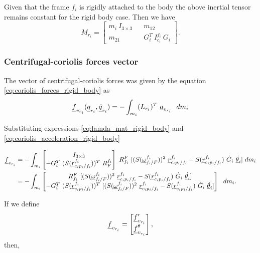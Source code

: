 Given that the frame $f_i$ is rigidly attached to the body the above inertial 
tensor remains constant for the rigid body case. Then we have 
\begin{equation}
    M_{r_i} = \begin{bmatrix}
        m_{i}\ I_{3 \times 3} && m_{12} \\ m_{21} && G^{T}_{i} \ I^{f_i}_{c_i}\ G_i
    \end{bmatrix}.
    \label{eq:mass_matrix_rigid_body}
\end{equation}



\subsubsection{Centrifugal-coriolis forces vector}
The vector of centrifugal-coriolis forces was given by the equation 
\eqref{eq:coriolis_forces_rigid_body} as
\[
    \vecd{f}_{v_{r_i}}(\vecd{q}_{r_{i}}, 
    \vecd{\dot{q}}_{r_{i}}) = - \int_{m_i} (L_{r_i})^{T} \ \vecd{a}_{v_{r_i}}\ 
    \ dm_{i}
\]

Substituting expressions \eqref{eq:lamda_mat_rigid_body} and 
\eqref{eq:coriolis_acceleration_rigid_body}

\begin{align}
    \vecd{f}_{v_{r_i}} &= - \int_{m_i} \begin{bmatrix} I_{3 \times 3} \\ -G^{T}_{i}\ (S(\pvec{r}{c_{i}p_{i}}{f_i}{f_i}))^{T}\ \rot{R}{F}{f_i}         
       \end{bmatrix}\ \rot{R}{f_{i}}{F}\ [ (S(\pvec{\omega}{f_{i}}{F}{f_i}))^{2} \ \pvec{r}{c_{i}p_{i}}{f_i}{f_i} 
    - S(\pvec{r}{c_{i}p_{i}}{f_i}{f_i})\ \dot{G}_{i} \ \dot{\vecd{\theta}_{i}}]
    \ dm_{i} \\
    &= - \int_{m_i} \begin{bmatrix}
    \rot{R}{f_{i}}{F}\ [ (S(\pvec{\omega}{f_{i}}{F}{f_i}))^{2} \ \pvec{r}{c_{i}p_{i}}{f_i}{f_i} 
    - S(\pvec{r}{c_{i}p_{i}}{f_i}{f_i})\ \dot{G}_{i} \ \dot{\vecd{\theta}_{i}}] \\ 
    -G^{T}_{i}\ (S(\pvec{r}{c_{i}p_{i}}{f_i}{f_i}))^{T}\ [ (S(\pvec{\omega}{f_{i}}{F}{f_i}))^{2} \ \pvec{r}{c_{i}p_{i}}{f_i}{f_i} 
    - S(\pvec{r}{c_{i}p_{i}}{f_i}{f_i}) \ \dot{G}_{i} \ \dot{\vecd{\theta}_{i}}]         
    \end{bmatrix}\
    \ dm_{i}.
\end{align}

If we define 
\[
   \underline{f}_{v_{r_i}} = \begin{bmatrix}
    \underline{f}^{r}_{v_{r_i}} \\ 
    \underline{f}^{\theta}_{v_{r_i}}
    \end{bmatrix},
\]
then,

